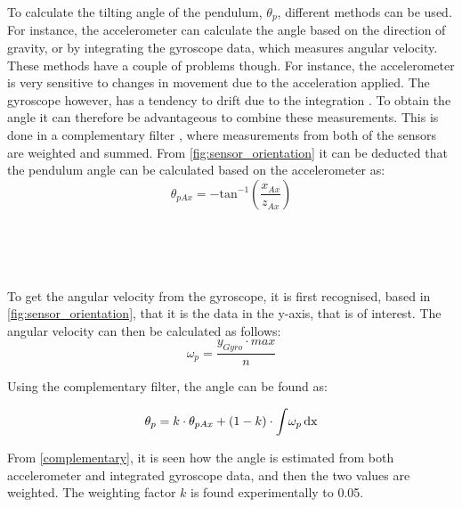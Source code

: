 To calculate the tilting angle of the pendulum, $\theta_p$, different methods can be used. For instance, the accelerometer can calculate the angle based on the direction of gravity, or by integrating the gyroscope data, which measures angular velocity. These methods have a couple of problems though. For instance, the accelerometer is very sensitive to changes in movement due to the acceleration applied. The gyroscope however, has a tendency to drift due to the integration \citep{IMU}. To obtain the angle it can therefore be advantageous to combine these measurements. This is done in a complementary filter \citep{IMU}, where measurements from both of the sensors are weighted and summed. 
\newpage
From \autoref{fig:sensor_orientation} it can be deducted that the pendulum angle can be calculated based on the accelerometer as: 
$$\theta_{pAx} = -\text{tan}^{-1}\left(\frac{x_{Ax}}{z_{Ax}}\right)$$ 
\begin{where}
\\
\\
\\
\end{where}

To get the angular velocity from the gyroscope, it is first recognised, based in \autoref{fig:sensor_orientation}, that it is the data in the y-axis, that is of interest. 
The angular velocity can then be calculated as follows:
\begin{equation}
\omega_p = \frac{y_{Gyro} \cdot max}{n}
\end{equation}
\begin{where}
\end{where}

Using the complementary filter, the angle can be found as:

\begin{equation}
\theta_p = k \cdot \theta_{pAx} + (1-k) \cdot \int \!\omega_p \,\rm{d}x
\label{complementary}
\end{equation}

From \autoref{complementary}, it is seen how the angle is estimated from both accelerometer and integrated gyroscope data, and then the two values are weighted. The weighting factor $k$ is found experimentally to 0.05.
\newpage
